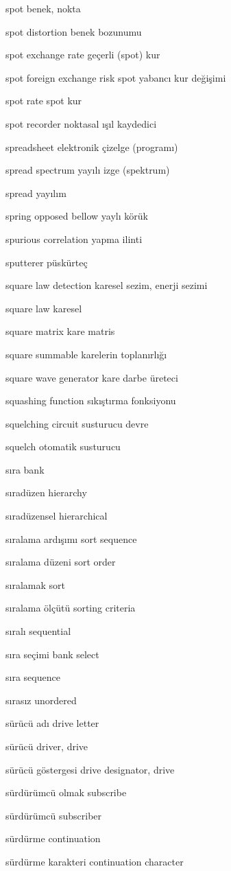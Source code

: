 \documentclass[12pt,fleqn]{article}\usepackage{../../common}
\begin{document}
spot benek, nokta

spot distortion benek bozunumu

spot exchange rate geçerli (spot) kur

spot foreign exchange risk spot yabancı kur değişimi

spot rate spot kur

spot recorder noktasal ışıl kaydedici

spreadsheet elektronik çizelge (programı)

spread spectrum yayılı izge (spektrum)

spread yayılım

spring opposed bellow yaylı körük

spurious correlation yapma ilinti

sputterer püskürteç

square law detection karesel sezim, enerji sezimi

square law karesel

square matrix kare matris

square summable karelerin toplanırlığı

square wave generator kare darbe üreteci

squashing function sıkıştırma fonksiyonu

squelching circuit susturucu devre

squelch otomatik susturucu

sıra bank

sıradüzen hierarchy

sıradüzensel hierarchical

sıralama ardışımı sort sequence

sıralama düzeni sort order

sıralamak sort

sıralama ölçütü sorting criteria

sıralı sequential

sıra seçimi bank select

sıra sequence

sırasız unordered

sürücü adı drive letter

sürücü driver, drive

sürücü göstergesi drive designator, drive

sürdürümcü olmak subscribe

sürdürümcü subscriber

sürdürme continuation

sürdürme karakteri continuation character
\end{document}

